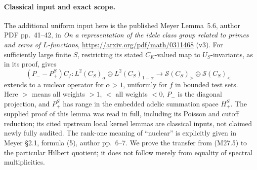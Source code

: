 \paragraph{Classical input and exact scope.}
The additional uniform input here is the published Meyer
Lemma~5.6, author PDF pp.~41--42, in
\emph{On a representation of the idele class group related
to primes and zeros of $L$-functions},
\url{https://arxiv.org/pdf/math/0311468} (v3).
For sufficiently large finite $S$, restricting its
stated $C_K$-valued map to $U_S$-invariants, as in
its proof, gives
\[
 (P_--P_+^S)C_f:
      L^2(C_S)_\alpha\oplus L^2(C_S)_{1-\alpha}
           \longrightarrow
          \mathcal S(C_S)_{>}\oplus\mathcal S(C_S)_{<}
                                                               \tag{M27.5}
\]
extends to a nuclear operator for $\alpha>1$,
uniformly for $f$ in bounded test sets.
Here $>$ means all weights $>1$, $<$ all weights $<0$,
$P_-$ is the diagonal projection, and $P_+^S$ has range
in the embedded adelic summation space $H_+^S$.
The supplied proof of this lemma was read in full,
including its Poisson and cutoff reduction; its cited
upstream local kernel lemmas are classical inputs, not
claimed newly fully audited. The rank-one meaning of
``nuclear'' is explicitly given in Meyer \S2.1, formula
(5), author pp.~6--7. We prove the transfer from (M27.5)
to the particular Hilbert quotient; it does not follow
merely from equality of spectral multiplicities.

